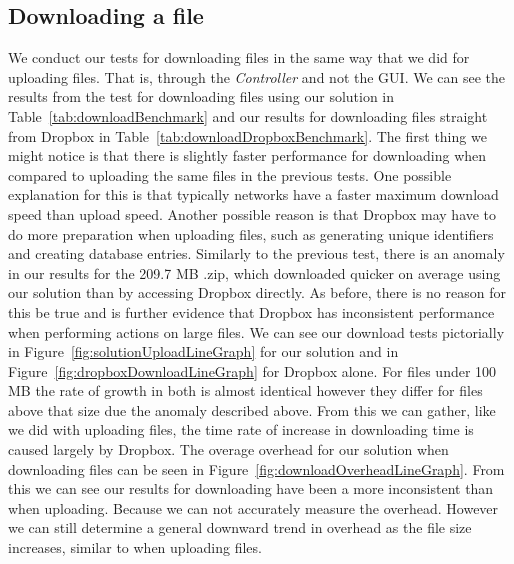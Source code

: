 \documentclass[12pt, titlepage]{article}
\begin{document}
\subsection{Downloading a file}
We conduct our tests for downloading files in the same way that we did for uploading files. That is, through the \textit{Controller} and not the GUI.
\newline \indent We can see the results from the test for downloading files using our solution in Table~\ref{tab:downloadBenchmark} and our results for downloading files straight from Dropbox in Table~\ref{tab:downloadDropboxBenchmark}. The first thing we might notice is that there is slightly faster performance for downloading when compared to uploading the same files in the previous tests. One possible explanation for this is that typically networks have a faster maximum download speed than upload speed. Another possible reason is that Dropbox may have to do more preparation when uploading files, such as generating unique identifiers and creating database entries.
\newline \indent Similarly to the previous test, there is an anomaly in our results for the 209.7 MB .zip, which downloaded quicker on average using our solution than by accessing Dropbox directly. As before, there is no reason for this be true and is further evidence that Dropbox has inconsistent performance when performing actions on large files.
\newline \indent We can see our download tests pictorially in Figure~\ref{fig:solutionUploadLineGraph} for our solution and in Figure~\ref{fig:dropboxDownloadLineGraph} for Dropbox alone. For files under 100 MB the rate of growth in both is almost identical however they differ for files above that size due the anomaly described above. From this we can gather, like we did with uploading files, the time rate of increase in downloading time is caused largely by Dropbox.
\newline \indent The overage overhead for our solution when downloading files can be seen in Figure~\ref{fig:downloadOverheadLineGraph}. From this we can see our results for downloading have been a more inconsistent than when uploading. Because we can not accurately measure the overhead. However we can still determine a general downward trend in overhead as the file size increases, similar to when uploading files.
\end{document}
